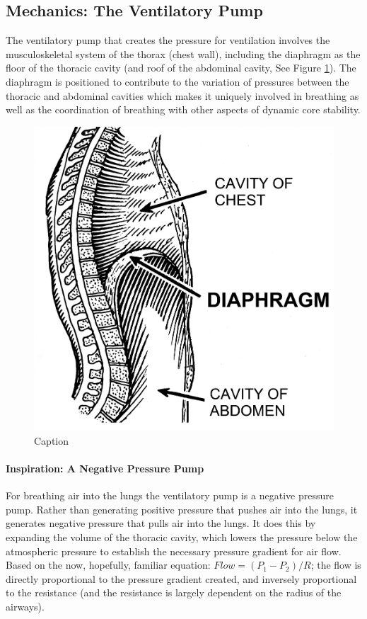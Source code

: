 \subsection{Mechanics: The Ventilatory Pump}

The ventilatory pump that creates the pressure for ventilation involves the musculoskeletal system of the thorax (chest wall), including the diaphragm as the floor of the thoracic cavity (and roof of the abdominal cavity, See Figure \ref{fig:diaphragm_lateral}). The diaphragm is positioned to contribute to the variation of pressures between the thoracic and abdominal cavities which makes it uniquely involved in breathing as well as the coordination of breathing with other aspects of dynamic core stability. 

\begin{figure}[!h]
    \centering
    \includegraphics[width=0.5 \linewidth]{./figure/diaphragm_lateral.png}
    \caption{Caption}
    \label{fig:diaphragm_lateral}
\end{figure}

\paragraph{Inspiration: A Negative Pressure Pump} For breathing air into the lungs the ventilatory pump is a negative pressure pump. Rather than generating positive pressure that pushes air into the lungs, it generates negative pressure that pulls air into the lungs. It does this by expanding the volume of the thoracic cavity, which lowers the pressure below the atmospheric pressure to establish the necessary pressure gradient for air flow. Based on the now, hopefully, familiar equation: $Flow = (P_1 - P_2) / R$; the flow is directly proportional to the pressure gradient created, and inversely proportional to the resistance (and the resistance is largely dependent on the radius of the airways). 

